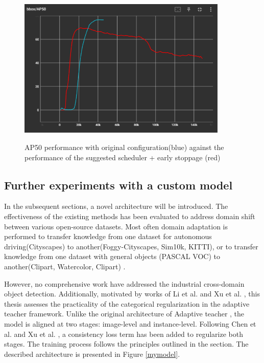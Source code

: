 \documentclass[english, 12pt, a4paper, elec, utf8, a-1b, online]{aaltothesis}
\begin{document}
\begin{figure}[htb]
	\begin{center}
		\includegraphics[width=10cm]{./adapt_teacher_exp1.png}
	\end{center}
	\caption{AP50 performance with original configuration(blue) against the performance of the suggested scheduler + early stoppage (red)}
	\begin{center}
		\label{exp1}
	\end{center}
\end{figure}
\FloatBarrier


\subsection{Further experiments with a custom model}
\label{mainExperiments} 
In the subsequent sections, a novel architecture will be introduced. The effectiveness of the existing methods has been evaluated to address domain shift  between various open-source datasets. Most often domain adaptation is performed to transfer knowledge from one dataset for autonomous driving(Cityscapes) to another(Foggy-Cityscapes, Sim10k, KITTI), or to transfer knowledge from one dataset with general objects (PASCAL VOC) to another(Clipart, Watercolor, Clipart) \cite{Oza2021}.  

However, no comprehensive work have addressed the industrial cross-domain object detection. Additionally, motivated by works of Li et al. \cite{Li2021} and Xu et al. \cite{Xu2020}, this thesis assesses the practicality of the categorical regularization in the adaptive teacher framework. Unlike the original architecture of Adaptive teacher \cite{Li2021}, the model is aligned at two stages:  image-level and instance-level. Following Chen et al. \cite{Chen2018} and Xu et al. \cite{Xu2020}, a consistency loss term has been added to regularize both stages. The training process follows the principles outlined in the  section. The described architecture is presented in Figure \ref{mymodel}. 
\end{document}
